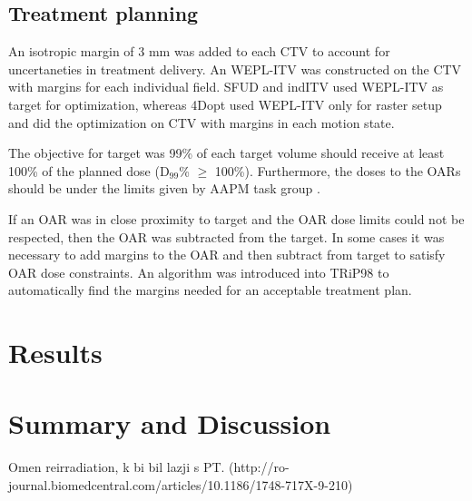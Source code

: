 \documentclass[type=dr, dr=rernat, accentcolor=tud7b,colorbacktitle, bigchapter, openright, twoside, 12pt ]{tudthesis}
\begin{document}
\subsection{Treatment planning}

An isotropic margin of 3 mm was added to each CTV to account for uncertaneties in treatment delivery. An WEPL-ITV was constructed on the CTV with margins for each individual field. 
SFUD and indITV used WEPL-ITV as target for optimization, whereas 4Dopt used WEPL-ITV only for raster setup and did the optimization on CTV with margins in each motion state.
  
The objective for target was 99\% of each target volume should receive at least 100\% of the planned dose (D$_{99}$\% $\geq$ 100\%). Furthermore, the doses to the OARs should be under the limits given by AAPM task group \cite{Benedict2010}. 

If an OAR was in close proximity to target and the OAR dose limits could not be respected, then the OAR was subtracted from the target. In some cases it was necessary to add margins to the OAR and then subtract from target to satisfy OAR dose constraints.
An algorithm was introduced into TRiP98 to automatically find the margins needed for an acceptable treatment plan.

\section{Results}

\section{Summary and Discussion}

Omen reirradiation, k bi bil lazji s PT. (http://ro-journal.biomedcentral.com/articles/10.1186/1748-717X-9-210)




{}
% 
\end{document}
